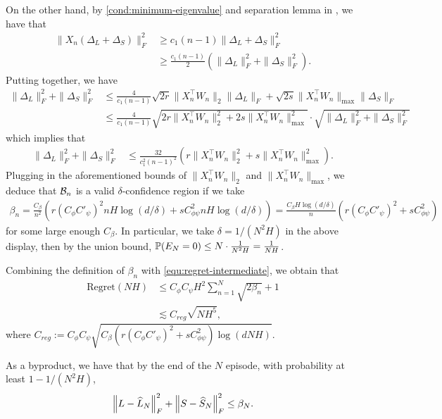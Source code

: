 On the other hand, by \eqref{cond:minimum-eigenvalue} and separation lemma in \cite{chai2024structured}, we have that 
\begin{align*}
\|X_n(\Delta_L+\Delta_S)\|_F^2&\ge c_1(n-1)\|\Delta_L+\Delta_S\|_F^2\\&\ge \frac{c_1(n-1)}{2}\left(\|\Delta_L\|_F^2+\|\Delta_S\|_F^2\right).
\end{align*}
Putting together, we have
\begin{align*}
\|\Delta_L\|_F^2+\|\Delta_S\|_F^2&\le \frac{4}{c_1(n-1)} \sqrt{2r}\|X_n^\top W_n\|_2\|\Delta_L\|_F+\sqrt{2s}\|X_n^\top W_n\|_{\max}\|\Delta_S\|_F
\\&\le \frac{4}{c_1(n-1)} \sqrt{2r\|X_n^\top W_n\|_2^2+2s\|X_n^\top W_n\|_{\max}^2}\cdot\sqrt{\|\Delta_L\|_F^2+\|\Delta_S\|_F^2}\end{align*}
which implies that 
\begin{align*}
\|\Delta_L\|_F^2+\|\Delta_S\|_F^2&\le \frac{32}{c_1^2(n-1)^2}\left(r\|X_n^\top W_n\|_2^2+s\|X_n^\top W_n\|_{\max}^2\right).
\end{align*}
Plugging in the aforementioned bounds of $\|X_n^\top W_n\|_2$ and $\|X_n^\top W_n\|_{\max}$, we deduce that ${\cal B}_n$ is a valid $\delta$-confidence region if we take \begin{align}
\label{def:beta}\beta_n=\frac{C_\beta}{n^2}\left(r(C_\phi C'_{\psi})^2 nH\log(d/\delta)+sC_{\phi\psi}^2nH\log(d/\delta)\right)=\frac{C_\beta H\log(d/\delta)}{n}\left(r(C_\phi C'_{\psi})^2 +sC_{\phi\psi}^2\right)
\end{align} 
for some large enough $C_\beta$. In particular, we take $\delta=1/(N^2H)$ in the above display, then by the union bound, $\mathbb{P}(E_N=0)\le N\cdot\frac{1}{N^2H}=\frac{1}{NH}$.

Combining the definition of $\beta_n$ with \eqref{equ:regret-intermediate}, we obtain that
\begin{align*}
\text{Regret}
(NH) &\le C_{\phi}C_{\psi}H^2\sum_{n=1}^N\sqrt{2\beta_n}+1\\
&\lesssim C_{reg}\sqrt{NH^5},
\end{align*}
where $C_{reg}:=C_\phi C_\psi \sqrt{C_\beta\left(r(C_\phi C'_{\psi})^2 +sC_{\phi\psi}^2\right)\log(dNH)}$.


As a byproduct, we have that by the end of the $N$ episode, with probability at least $1-1/(N^2H)$,
\begin{align*}
\left\lVert L-\widehat L_N\right\rVert_F^2+\left\lVert S-\widehat S_N\right\rVert_F^2\leq \beta_N.
\end{align*}



